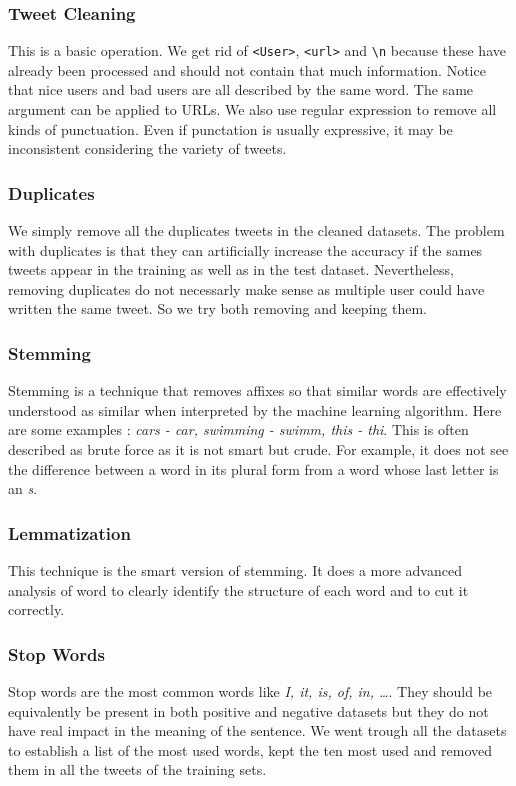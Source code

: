\documentclass[11pt, a4paper, twocolumn]{article}
\begin{document}
\subsubsection{Tweet Cleaning}
This is a basic operation. We get rid of \texttt{<User>}, \texttt{<url>} and \verb"\n" because these have already been processed and should not contain that much information. Notice that nice users and bad users are all described by the same word. The same argument can be applied to URLs. We also use regular expression to remove all kinds of punctuation. Even if punctation is usually expressive, it may be inconsistent considering the variety of tweets.

\subsubsection{Duplicates}
We simply remove all the duplicates tweets in the cleaned datasets. The problem with duplicates is that they can artificially increase the accuracy if the sames tweets appear in the training as well as in the test dataset. Nevertheless, removing duplicates do not necessarly make sense as multiple user could have written the same tweet. So we try both removing and keeping them.

\subsubsection{Stemming}
Stemming is a technique that removes affixes so that similar words are effectively understood as similar when interpreted by the machine learning algorithm. Here are some examples : \textit{cars - car, swimming - swimm, this - thi}. This is often described as brute force as it is not smart but crude. For example, it does not see the difference between a word in its plural form from a word whose last letter is an \textit{s}.

\subsubsection{Lemmatization}
This technique is the smart version of stemming. It does a more advanced analysis of word to clearly identify the structure of each word and to cut it correctly.

\subsubsection{Stop Words}
Stop words are the most common words like \textit{I, it, is, of, in, \dots}. They should be equivalently be present in both positive and negative datasets but they do not have real impact in the meaning of the sentence. We went trough all the datasets to establish a list of the most used words, kept the ten most used and removed them in all the tweets of the training sets.
\end{document}
